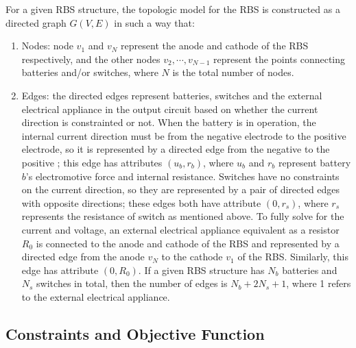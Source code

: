 \documentclass{article}
\begin{document}
For a given RBS structure, the topologic model for the RBS is constructed as a directed graph $G(V,E)$ in such a way that:
\begin{enumerate}
    \item Nodes: node $v_1$ and $v_N$ represent the anode and cathode of the RBS respectively, and the other nodes $v_2,\cdots , v_{N-1}$ represent the points connecting batteries and/or switches, where $N$ is the total number of nodes.
    \item Edges: the directed edges represent batteries, switches and the external electrical appliance in the output circuit based on whether the current direction is constrainted or not. 
        When the battery is in operation, the internal current direction must be from the negative electrode to the positive electrode, so it is represented by a directed edge from the negative to the positive ; this edge has attributes $(u_b, r_b)$, where $u_b$ and $r_b$ represent battery $b$'s electromotive force and internal resistance.
        Switches have no constraints on the current direction, so they are represented by a pair of directed edges with opposite directions; these edges both have attribute $(0, r_s)$, where $r_s$ represents the resistance of switch as mentioned above.
        To fully solve for the current and voltage, an external electrical appliance equivalent as a resistor $R_0$ is connected to the anode and cathode of the RBS and represented by a directed edge from the anode $v_N$  to the cathode $v_1$ of the RBS.
        Similarly, this edge has attribute $(0, R_0)$.
        If a given RBS structure has $N_b$ batteries and $N_s$ switches in total, then the number of edges is $N_b+2N_s+1$, where 1 refers to the external electrical appliance.
\end{enumerate}

\subsection{Constraints and Objective Function}
\end{document}
